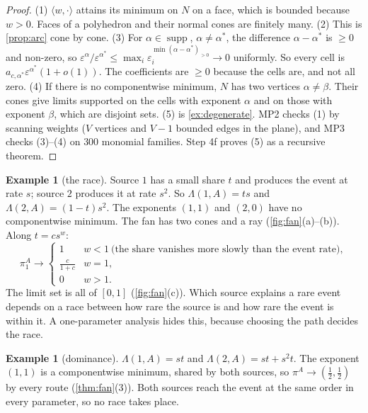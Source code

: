 \documentclass[11pt]{article}
\theoremstyle{definition}\newtheorem{definition}[theorem]{Definition}\newtheorem{remark}[theorem]{Remark}\newtheorem{example}[theorem]{Example}
\begin{document}
\begin{proof}
(1) $\langle w,\cdot\rangle$ attains its minimum on $N$ on a face, which is bounded because $w>0$. Faces of a polyhedron and their normal cones
are finitely many. (2) This is \cref{prop:arc} cone by cone. (3) For $\alpha\in\operatorname{supp}$, $\alpha\ne\alpha^*$, the difference $\alpha-\alpha^*$ is $\ge0$ and
non-zero, so $\varepsilon^\alpha/\varepsilon^{\alpha^*}\le\max_i\varepsilon_i^{\min(\alpha-\alpha^*)_{>0}}\to0$ uniformly. So every cell is $a_{c,\alpha^*}\varepsilon^{\alpha^*}(1+o(1))$. The coefficients are
$\ge0$ because the cells are, and not all zero. (4) If there is no componentwise minimum, $N$ has two vertices $\alpha\ne\beta$. Their cones give
limits supported on the cells with exponent $\alpha$ and on those with exponent $\beta$, which are disjoint sets. (5) is \cref{ex:degenerate}.
MP2 checks (1) by scanning weights ($V$ vertices and $V-1$ bounded edges in the plane), and MP3 checks (3)--(4) on $300$ monomial
families. Step 4f proves (5) as a recursive theorem.
\end{proof}

\begin{example}[the race]\label{ex:race}
Source $1$ has a small share $t$ and produces the event at rate $s$; source $2$ produces it at rate $s^2$. So $\Lambda(1,A)=ts$ and
$\Lambda(2,A)=(1-t)s^2$. The exponents $(1,1)$ and $(2,0)$ have no componentwise minimum. The fan has two cones and a ray
(\cref{fig:fan}(a)--(b)). Along $t=cs^w$:
\[
\pi^A_1\to\begin{cases}1&w<1\ \text{(the share vanishes more slowly than the event rate)},\\ \tfrac c{1+c}&w=1,\\ 0&w>1 .\end{cases}
\]
The limit set is all of $[0,1]$ (\cref{fig:fan}(c)). Which source explains a rare event depends on a race between how rare the source
is and how rare the event is within it. A one-parameter analysis hides this, because choosing the path decides the race.
\end{example}

\begin{example}[dominance]\label{ex:dominance}
$\Lambda(1,A)=st$ and $\Lambda(2,A)=st+s^2t$. The exponent $(1,1)$ is a componentwise minimum, shared by both sources, so
$\pi^A\to(\tfrac12,\tfrac12)$ by every route (\cref{thm:fan}(3)). Both sources reach the event at the same order in every parameter, so no race
takes place.
\end{example}
\end{document}
